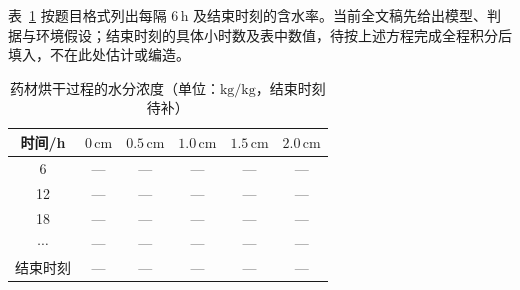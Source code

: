 表~\ref{tab:q3C} 按题目格式列出每隔 $6\,\mathrm{h}$ 及结束时刻的含水率。当前全文稿先给出模型、判据与环境假设；结束时刻的具体小时数及表中数值，待按上述方程完成全程积分后填入，不在此处估计或编造。

\begin{table}[htbp]
\centering
\caption{药材烘干过程的水分浓度（单位：$\mathrm{kg/kg}$，结束时刻待补）}
\label{tab:q3C}
\begin{tabular}{cccccc}
\toprule
时间/h & $0\,\mathrm{cm}$ & $0.5\,\mathrm{cm}$ & $1.0\,\mathrm{cm}$ & $1.5\,\mathrm{cm}$ & $2.0\,\mathrm{cm}$ \\
\midrule
6  & --- & --- & --- & --- & --- \\
12 & --- & --- & --- & --- & --- \\
18 & --- & --- & --- & --- & --- \\
$\cdots$ & --- & --- & --- & --- & --- \\
结束时刻 & --- & --- & --- & --- & --- \\
\bottomrule
\end{tabular}
\end{table}
